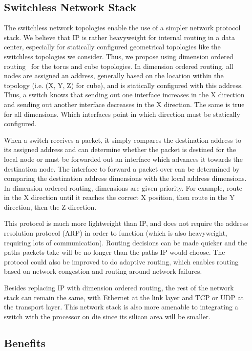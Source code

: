 \subsection{Switchless Network Stack}

The switchless network topologies enable the use of a simpler network protocol stack.  We believe that IP is rather heavyweight for internal routing in a data center, especially for statically configured geometrical topologies like the switchless topologies we consider.  Thus, we propose using dimension ordered routing~\cite{Ni:1993:SWRTDN} for the torus and cube topologies.  In dimension ordered routing, all nodes are assigned an address, generally based on the location within the topology (i.e. (X, Y, Z) for cube), and is statically configured with this address.  Thus, a switch knows that sending out one interface increases in the X direction and sending out another interface decreases in the X direction.  The same is true for all dimensions.  Which interfaces point in which direction must be statically configured.  

When a switch receives a packet, it simply compares the destination address to its assigned address and can determine whether the packet is destined for the local node or must be forwarded out an interface which advances it towards the destination node.  The interface to forward a packet over can be determined by comparing the destination address dimensions with the local address dimensions.  In dimension ordered routing, dimensions are given priority.  For example, route in the X direction until it reaches the correct X position, then route in the Y direction, then the Z direction.

This protocol is much more lightweight than IP, and does not require the address resolution protocol (ARP) in order to function (which is also heavyweight, requiring lots of communication).  Routing decisions can be made quicker and the paths packets take will be no longer than the paths IP would choose.  The protocol could also be improved to do adaptive routing, which enables routing based on network congestion and routing around network failures.  

Besides replacing IP with dimension ordered routing, the rest of the network stack can remain the same, with Ethernet at the link layer and TCP or UDP at the transport layer.  This network stack is also more amenable to integrating a switch with the processor on die since its silicon area will be smaller.

\subsection{Benefits}

